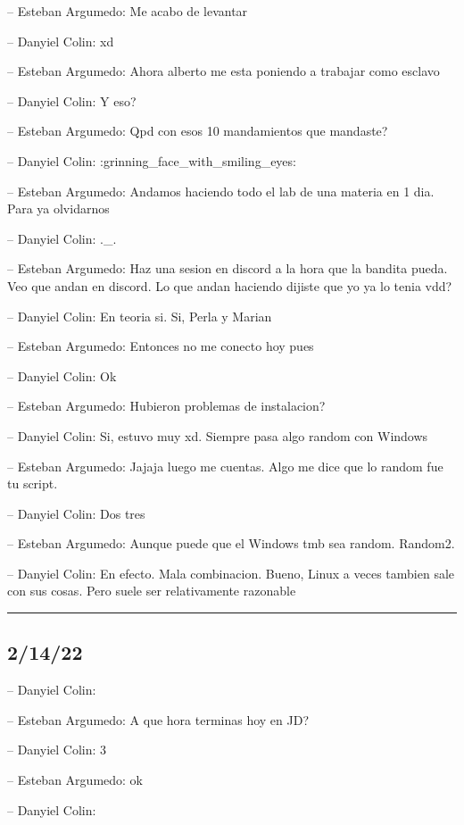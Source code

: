 -- Esteban Argumedo: Me acabo de levantar

-- Danyiel Colin: xd

-- Esteban Argumedo: Ahora alberto me esta poniendo a trabajar como
esclavo

-- Danyiel Colin: Y eso?

-- Esteban Argumedo: Qpd con esos 10 mandamientos que mandaste?

-- Danyiel Colin: :grinning\_face\_with\_smiling\_eyes:

-- Esteban Argumedo: Andamos haciendo todo el lab de una materia en 1
dia. Para ya olvidarnos

-- Danyiel Colin: .\_.

-- Esteban Argumedo: Haz una sesion en discord a la hora que la bandita
pueda. Veo que andan en discord. Lo que andan haciendo dijiste que yo ya
lo tenia vdd?

-- Danyiel Colin: En teoria si. Si, Perla y Marian

-- Esteban Argumedo: Entonces no me conecto hoy pues

-- Danyiel Colin: Ok

-- Esteban Argumedo: Hubieron problemas de instalacion?

-- Danyiel Colin: Si, estuvo muy xd. Siempre pasa algo random con
Windows

-- Esteban Argumedo: Jajaja luego me cuentas. Algo me dice que lo random
fue tu script.

-- Danyiel Colin: Dos tres

-- Esteban Argumedo: Aunque puede que el Windows tmb sea random.
Random2.

-- Danyiel Colin: En efecto. Mala combinacion. Bueno, Linux a veces
tambien sale con sus cosas. Pero suele ser relativamente razonable

\begin{center}\rule{0.5\linewidth}{0.5pt}\end{center}

\hypertarget{section-6}{\subsection{2/14/22}\label{section-6}}

-- Danyiel Colin:

-- Esteban Argumedo: A que hora terminas hoy en JD?

-- Danyiel Colin: 3

-- Esteban Argumedo: ok

-- Danyiel Colin:

